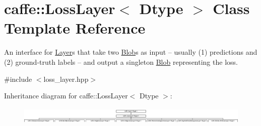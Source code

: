 \hypertarget{classcaffe_1_1LossLayer}{}\section{caffe\+:\+:Loss\+Layer$<$ Dtype $>$ Class Template Reference}
\label{classcaffe_1_1LossLayer}


An interface for \hyperlink{classcaffe_1_1Layer}{Layer}s that take two \hyperlink{classcaffe_1_1Blob}{Blob}s as input -- usually (1) predictions and (2) ground-\/truth labels -- and output a singleton \hyperlink{classcaffe_1_1Blob}{Blob} representing the loss.  




{\ttfamily \#include $<$loss\+\_\+layer.\+hpp$>$}

Inheritance diagram for caffe\+:\+:Loss\+Layer$<$ Dtype $>$\+:\begin{figure}[H]
\begin{center}
\leavevmode
\includegraphics[height=0.821918cm]{classcaffe_1_1LossLayer}
\end{center}
\end{figure}
